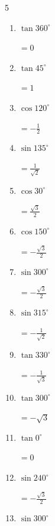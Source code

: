 \begin{multicols}{5}
\begin{enumerate}
        $\displaystyle =\frac{1}{\sqrt{3}}$

  \item $\displaystyle \tan{360^\circ}$

        $\displaystyle =0$

  \item $\displaystyle \tan{45^\circ}$

        $\displaystyle =1$

  \item $\displaystyle \cos{120^\circ}$

        $\displaystyle =-\frac{1}{2}$

  \item $\displaystyle \sin{135^\circ}$

        $\displaystyle =\frac{1}{\sqrt{2}}$

  \item $\displaystyle \cos{30^\circ}$

        $\displaystyle =\frac{\sqrt{3}}{2}$

\columnbreak %

  \item $\displaystyle \cos{150^\circ}$

        $\displaystyle =-\frac{\sqrt{3}}{2}$

  \item $\displaystyle \sin{300^\circ}$

        $\displaystyle =-\frac{\sqrt{3}}{2}$

  \item $\displaystyle \sin{315^\circ}$

        $\displaystyle =-\frac{1}{\sqrt{2}}$

  \item $\displaystyle \tan{330^\circ}$

        $\displaystyle =-\frac{1}{\sqrt{3}}$

  \item $\displaystyle \tan{300^\circ}$

        $\displaystyle =-\sqrt{3}$

  \item $\displaystyle \tan{0^\circ}$

        $\displaystyle =0$

  \item $\displaystyle \sin{240^\circ}$

        $\displaystyle =-\frac{\sqrt{3}}{2}$

  \item $\displaystyle \sin{300^\circ}$


\end{enumerate}
\end{multicols}

